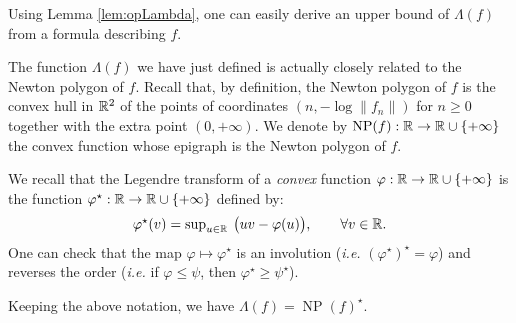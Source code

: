 \documentclass{lms}
\DeclareMathOperator{\NP}{NP}
\begin{document}
\begin{rem}
\label{rem:opLambda}
Using Lemma \ref{lem:opLambda}, one can easily derive an upper 
bound of $\Lambda(f)$ from a formula describing $f$.
\end{rem}

The function $\Lambda(f)$ we have just defined is actually closely 
related to the Newton polygon of $f$. Recall that, by definition, the 
Newton polygon of $f$ is the convex hull in $\mathbb R^2$ of the points of 
coordinates $(n, - \log \lVert f_n \rVert )$ for $n \geq 0$ together 
with the extra point $(0, +\infty)$. We denote by $\NP(f) : \R \to \R 
\cup \{+\infty\}$ the convex function whose epigraph is the Newton 
polygon of $f$.

We recall that the Legendre transform of a \emph{convex} function 
$\varphi : \mathbb R \to \mathbb R \cup \{+\infty\}$ is the function $\varphi^\star : 
\mathbb R \to \mathbb R \cup \{+\infty\}$ defined by:
$$\textstyle \varphi^\star(v) = \sup_{u \in \mathbb R} \:
\big(uv - \varphi(u)\big), \qquad
\forall v \in \mathbb R.$$
One can check that the map $\varphi \mapsto \varphi^\star$ is an
involution (\emph{i.e.} $(\varphi^\star)^\star = \varphi$) and
reverses the order (\emph{i.e.} if $\varphi \leq \psi$, then
$\varphi^\star \geq \psi^\star$). 

%

\begin{prop} \label{prop:lambdaNP}
Keeping the above notation, we have $\Lambda (f) = \NP(f)^\star$.
\end{prop}
\end{document}
